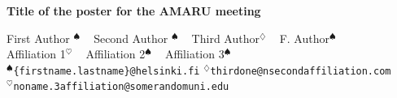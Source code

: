 \documentclass[portrait]{Hylangtechposter}
\begin{document}
\printheader

\begin{center}
\textbf{\bf\veryHuge\color{NavyBlue}Title of the poster for the AMARU meeting \\[1.5cm]}

\huge First Author $^{\spadesuit}$ ~
    Second Author $^{\spadesuit}$ ~ 
    Third Author$^{\diamondsuit}$ ~ 
    F. Author$^{\spadesuit}$ \\[0.2cm] 
\Large Affiliation 1$^{\heartsuit}$ ~ 
    Affiliation 2$^{\spadesuit}$ ~
    Affiliation 3$^{\spadesuit}$ \\[0.2cm]
\Large    $^{\spadesuit}$\texttt{\{firstname.lastname\}@helsinki.fi} \qquad $^{\diamondsuit}$\texttt{thirdone@nsecondaffiliation.com} \\
\Large   $^{\heartsuit}$\texttt{noname.3affiliation@somerandomuni.edu} 
 \end{center}

\vspace{2cm}

 \color{Navy}

  



 \Large
\end{document}
